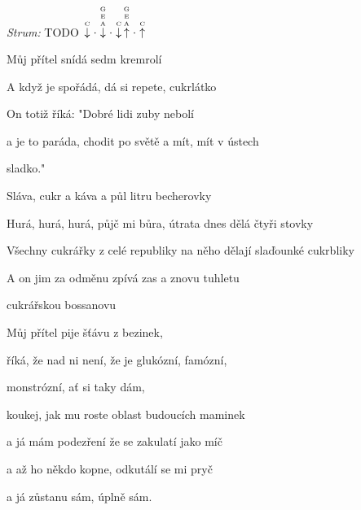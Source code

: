 \begin{song}


 \quad
\textit{Strum:} TODO $\PluckDown{C}\Miss\PluckDown{G E A}\Miss\PluckDown{C}\PluckUp{G E A}\Miss\PluckUp{C}$

\large


\large

\bigskip

Můj přítel  snídá sedm kremrolí  \par
A když je spořádá, dá si repete, cukrlátko  \par
On totiž říká:  "Dobré lidi zuby nebolí  \par
a je to paráda, chodit po světě a mít, mít v ústech \par
{}sladko."    \par

\bigskip

\begin{chorusboxwide}{\Refren}
Sláva,  cukr a káva a půl litru becherovky \par
{}Hurá, hurá, hurá, půjč mi bůra, útrata dnes dělá čtyři stovky \par
Všechny cukrářky z celé  republiky na něho dělají slaďounké cukrbliky \par
A on jim za odměnu zpívá zas a znovu tuhletu  \par
cukrářskou bossanovu    \par
\end{chorusboxwide}

\bigskip

Můj přítel  pije šťávu z bezinek,  \par
říká, že nad ni není, že je glukózní, famózní, \par
{}monstrózní, ať si taky dám, \par
koukej, jak mu roste  oblast budoucích maminek  \par
a já mám podezření že se zakulatí jako míč \par
a až ho někdo kopne, odkutálí se mi pryč \par
a já zůstanu sám,  úplně sám.  \par


\end{song}
